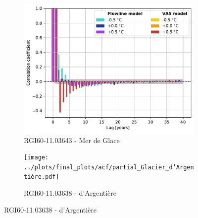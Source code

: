 \begin{figure}[htp]
        \begin{subfigure}[b]{0.48\textwidth}
          \caption{RGI60-11.03643 - Mer de Glace}
          \label{fig:acf:mer_de_glace}
          \centering
          \includegraphics[width=\textwidth]{../plots/final_plots/acf/partial_Mer_de_Glace.pdf}
        \end{subfigure}
        \hfill
        \begin{subfigure}[b]{0.48\textwidth}
          \caption{RGI60-11.03638 - d'Argentière}
          \label{fig:acf:glacier_d_argentiere}
          \centering
          \texttt{[image: ../plots/final\_plots/acf/partial\_Glacier\_d'Argentière.pdf]}
        \end{subfigure}


\end{figure}
